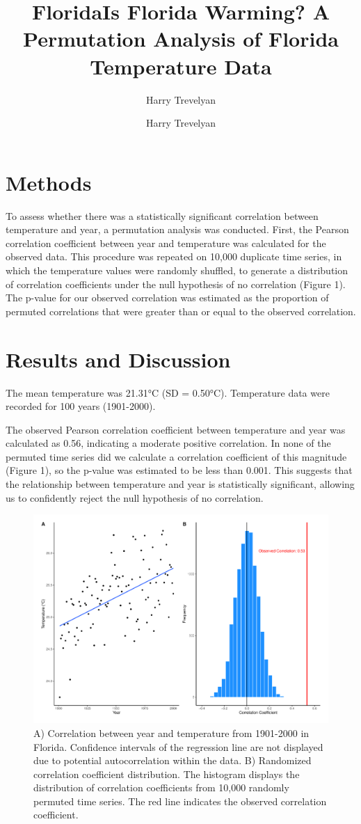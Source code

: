 \documentclass{article}
\title{Florida}
\author{Harry Trevelyan}
\date{}
\title{Is Florida Warming? A Permutation Analysis of Florida Temperature Data}
\author{Harry Trevelyan}
\date{} %
\begin{document}
\maketitle

\section*{Methods}
To assess whether there was a statistically significant correlation between temperature and year, a permutation analysis was conducted. First, the Pearson correlation coefficient between year and temperature was calculated for the observed data. This procedure was repeated on 10,000 duplicate time series, in which the temperature values were randomly shuffled, to generate a distribution of correlation coefficients under the null hypothesis of no correlation (Figure 1). The p-value for our observed correlation was estimated as the proportion of permuted correlations that were greater than or equal to the observed correlation.

\section*{Results and Discussion}
The mean temperature was 21.31°C (SD = 0.50°C). Temperature data were recorded for 100 years (1901-2000).

The observed Pearson correlation coefficient between temperature and year was calculated as 0.56, indicating a moderate positive correlation. In none of the permuted time series did we calculate a correlation coefficient of this magnitude (Figure 1), so the p-value was estimated to be less than 0.001. This suggests that the relationship between temperature and year is statistically significant, allowing us to confidently reject the null hypothesis of no correlation.


\begin{figure}[ht]
    \centering
    \includegraphics[height = 0.6\textwidth]{../results/Florida_plots.pdf}
    \caption{ A) Correlation between year and temperature from 1901-2000 in Florida. Confidence intervals of the regression line are not displayed due to potential autocorrelation within the data. B) Randomized correlation coefficient distribution. The histogram displays the distribution of correlation coefficients from 10,000 randomly permuted time series. The red line indicates the observed correlation coefficient. }
    \label{fig:floridaplots}
\end{figure}
\end{document}
